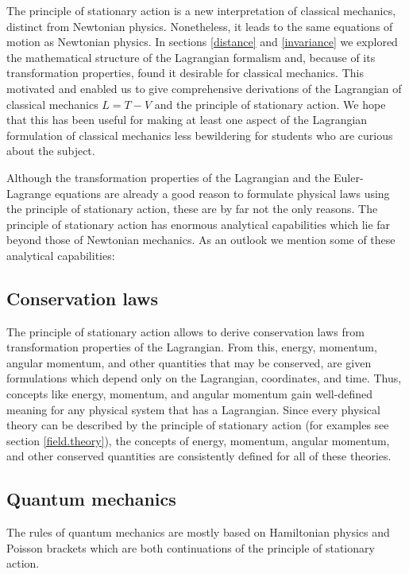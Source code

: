 \documentclass[prb,preprint]{revtex4-1}
\begin{document}
The principle of stationary action is a new interpretation of classical mechanics, distinct from Newtonian physics. Nonetheless, it leads to the same equations of motion as Newtonian physics. In sections \ref{distance} and \ref{invariance} we explored the mathematical structure of the Lagrangian formalism and, because of its transformation properties, found it desirable for classical mechanics. This motivated and enabled us to give comprehensive derivations of the Lagrangian of classical mechanics $L=T-V$ and the principle of stationary action. We hope that this has been useful for making at least one aspect of the Lagrangian formulation of classical mechanics less bewildering for students who are curious about the subject.


Although the transformation properties of the Lagrangian and the Euler-Lagrange equations are already a good reason to formulate physical laws using the principle of stationary action, these are by far not the only reasons. The principle of stationary action has enormous analytical capabilities which lie far beyond those of Newtonian mechanics. As an outlook we mention some of these analytical capabilities:

\subsection{Conservation laws \cite{KleinertConservation}}
The principle of stationary action allows to derive conservation laws from transformation properties of the Lagrangian. From this, energy, momentum, angular momentum, and other quantities that may be conserved, are given formulations which depend only on the Lagrangian, coordinates, and time. Thus, concepts like energy, momentum, and angular momentum gain well-defined meaning for any physical system that has a Lagrangian. Since every physical theory can be described by the principle of stationary action (for examples see section \ref{field.theory}), the concepts of energy, momentum, angular momentum, and other conserved quantities are consistently defined for all of these theories.

\subsection{Quantum mechanics \cite{Schwabl}}
The rules of quantum mechanics are mostly based on Hamiltonian physics and Poisson brackets which are both continuations of the principle of stationary action.
\end{document}
